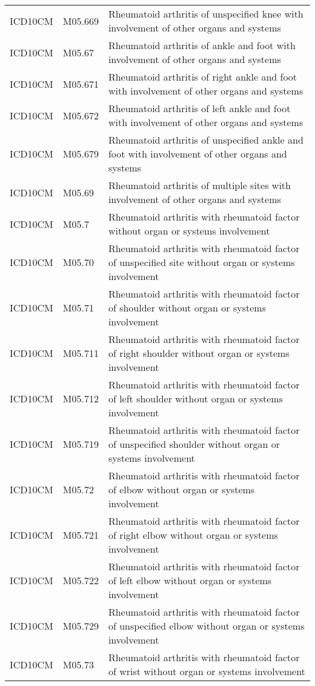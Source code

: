 \begin{longtable}{p{}p{}p{}}
  ICD10CM & M05.669 & Rheumatoid arthritis of unspecified knee with involvement of other organs and systems \\ 
  ICD10CM & M05.67 & Rheumatoid arthritis of ankle and foot with involvement of other organs and systems \\ 
  ICD10CM & M05.671 & Rheumatoid arthritis of right ankle and foot with involvement of other organs and systems \\ 
  ICD10CM & M05.672 & Rheumatoid arthritis of left ankle and foot with involvement of other organs and systems \\ 
  ICD10CM & M05.679 & Rheumatoid arthritis of unspecified ankle and foot with involvement of other organs and systems \\ 
  ICD10CM & M05.69 & Rheumatoid arthritis of multiple sites with involvement of other organs and systems \\ 
  ICD10CM & M05.7 & Rheumatoid arthritis with rheumatoid factor without organ or systems involvement \\ 
  ICD10CM & M05.70 & Rheumatoid arthritis with rheumatoid factor of unspecified site without organ or systems involvement \\ 
  ICD10CM & M05.71 & Rheumatoid arthritis with rheumatoid factor of shoulder without organ or systems involvement \\ 
  ICD10CM & M05.711 & Rheumatoid arthritis with rheumatoid factor of right shoulder without organ or systems involvement \\ 
  ICD10CM & M05.712 & Rheumatoid arthritis with rheumatoid factor of left shoulder without organ or systems involvement \\ 
  ICD10CM & M05.719 & Rheumatoid arthritis with rheumatoid factor of unspecified shoulder without organ or systems involvement \\ 
  ICD10CM & M05.72 & Rheumatoid arthritis with rheumatoid factor of elbow without organ or systems involvement \\ 
  ICD10CM & M05.721 & Rheumatoid arthritis with rheumatoid factor of right elbow without organ or systems involvement \\ 
  ICD10CM & M05.722 & Rheumatoid arthritis with rheumatoid factor of left elbow without organ or systems involvement \\ 
  ICD10CM & M05.729 & Rheumatoid arthritis with rheumatoid factor of unspecified elbow without organ or systems involvement \\ 
  ICD10CM & M05.73 & Rheumatoid arthritis with rheumatoid factor of wrist without organ or systems involvement \\ 

\end{longtable}
